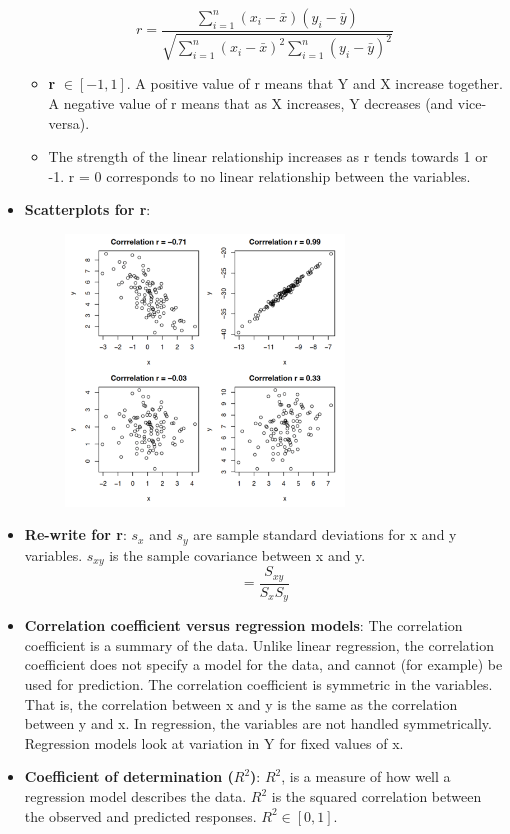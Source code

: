 \documentclass[12pt]{book}
\begin{document}
\begin{itemize}
$$r = \frac{\sum_{i=1}^{n} (x_i - \bar{x})(y_i - \bar{y})}{\sqrt{\sum_{i=1}^{n}(x_i - \bar{x})^2 \sum_{i=1}^{n}(y_i - \bar{y})^2}}$$
\begin{itemize}
\item \textbf{r} $\in [-1, 1]$. A positive value of r means that Y and X increase together. A negative value of r means that as X increases, Y decreases (and vice-versa). 
\item The strength of the linear relationship increases as r tends towards 1 or -1. r = 0 corresponds to no linear relationship between the variables.
\end{itemize}
\item \textbf{Scatterplots for r}: 
\begin{figure}[H]
    \centering
    \includegraphics[width=0.7\textwidth]{8.png}
\end{figure}
\item \textbf{Re-write for r}: $s_x$ and $s_y$ are sample standard deviations for x and y variables. $s_{xy}$ is the sample covariance between x and y.
$$= \frac{S_{xy}}{S_x S_y}$$
\item \textbf{Correlation coefficient versus regression models}: The correlation coefficient is a summary of the data. Unlike linear regression, the correlation coefficient does not specify a model for the data, and cannot (for example) be used for prediction. The correlation coefficient is symmetric in the variables. That is, the correlation between x and y is the same as the correlation between y and x. In regression, the variables are not handled symmetrically. Regression models look at variation in Y for fixed values of x.
\item \textbf{Coefficient of determination ($R^2$)}: $R^2$, is a measure of how well a regression model describes the data. $R^2$ is the squared correlation between the observed and predicted responses. $R^2 \in [0, 1]$.

\end{itemize}
\end{document}
